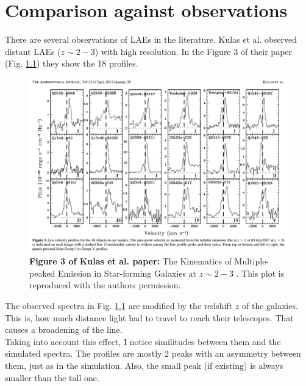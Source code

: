 \setcounter{equation}{0}
\chapter{Comparison against observations}
\label{chap:discussion}

There are several observations of LAEs in the literature. Kulas et al. \cite{Kulas12} observed distant LAEs ($z\sim2-3$) with high resolution. In the Figure 3 of their paper (Fig. \ref{fig:kulas}) they show the 18 \lya profiles. \\

\begin{figure}[h!]
	\begin{center}
		\includegraphics[width=1\textwidth]{./figures/chapter4/figure3}
	\end{center}
	\caption{\textbf{Figure 3 of Kulas et al. paper:} The Kinematics of Multiple-peaked \lya Emission in Star-forming Galaxies at $z\sim2-3$ \cite{Kulas12}. This plot is reproduced with the authors permission.
		\label{fig:kulas}}
\end{figure}

The observed spectra in Fig. \ref{fig:kulas} are modified by the redshift $z$ of the galaxies. This is, how much distance light had to travel to reach their telescopes. That causes a broadening of the line. \\

Taking into account this effect, I notice similitudes between them and the simulated spectra. The \lya profiles are mostly 2 peaks with an asymmetry between them, just as in the simulation. Also, the small peak (if existing) is always smaller than the tall one.\\

